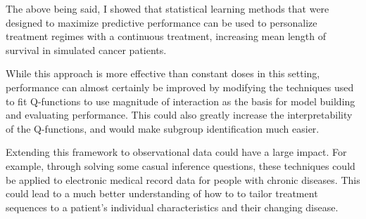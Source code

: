 \documentclass[12pt]{article}
\begin{document}
The above being said, I showed that statistical learning methods that were designed to maximize predictive performance can be used to personalize treatment regimes with a continuous treatment, increasing mean length of survival in simulated cancer patients.

While this approach is more effective than constant doses in this setting, performance can almost certainly be improved by modifying the techniques used to fit Q-functions to use magnitude of interaction as the basis for model building and evaluating performance. This could also greatly increase the interpretability of the Q-functions, and would make subgroup identification much easier. 

Extending this framework to observational data could have a large impact.  For example, through solving some casual inference questions, these techniques could be applied to electronic medical record data for people with chronic diseases. This could lead to a much better understanding of how to to tailor treatment sequences to a patient's individual characteristics and their changing disease.


\printbibliography
\end{document}
